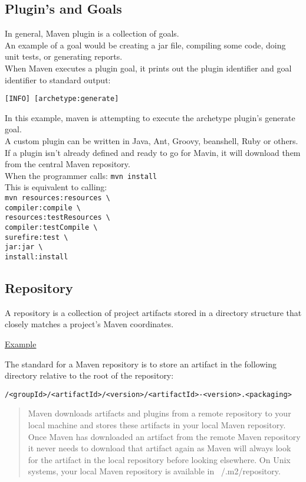 \documentclass[12pt]{extarticle}
\newcommand\tab[1][1cm]{\hspace*{#1}}
\theoremstyle{plain}
\theoremstyle{Definition}
\theoremstyle{Definition}
\theoremstyle{plain}
\begin{document}
	\subsection{Plugin's and Goals}		
		In general, Maven plugin is a collection of goals. \\
		An example of a goal would be creating a jar file, compiling some code, doing unit tests, or generating reports. \\
		When Maven executes a plugin goal, it prints out the plugin identifier and goal identifier to standard output:
		\begin{center}
			\verb|[INFO] [archetype:generate]| 
		\end{center}
		In this example, maven is attempting to execute the archetype plugin's generate goal. \\ 
		A custom plugin can be written in Java, Ant, Groovy, beanshell, Ruby or others. \\ 
		If a plugin isn't already defined and ready to go for Mavin, it will download them from the central Maven repository. \\
		When the programmer calls: 
		\verb|mvn install| \\
		This is equivalent to calling: \\ 
		\verb|mvn resources:resources \| \\
		\tab \verb|compiler:compile \| \\
		\tab \verb|resources:testResources \| \\
		\tab \verb|compiler:testCompile \|  \\
		\tab \verb|surefire:test \| \\
		\tab \verb|jar:jar \| \\
		\tab \verb|install:install | \\		
	\subsection{Repository}
		A repository is a collection of project artifacts stored in a directory structure that closely matches a project’s Maven coordinates.
		\begin{center}
			\href{https://repo1.maven.org/maven2/}{Example}
		\end{center}
		The standard for a Maven repository is to store an artifact in the following directory relative to the root of the repository:
		\begin{center}
			\verb|/<groupId>/<artifactId>/<version>/<artifactId>-<version>.<packaging>|
		\end{center}
		\begin{quotation}
			Maven downloads artifacts and plugins from a remote repository to your local machine and stores these artifacts in your local Maven repository. Once Maven has downloaded an artifact from the remote Maven repository it never needs to download that artifact again as Maven will always look for the artifact in the local repository before looking elsewhere. On Unix systems, your local Maven repository is available in ~/.m2/repository.
		\end{quotation}
\end{document}
